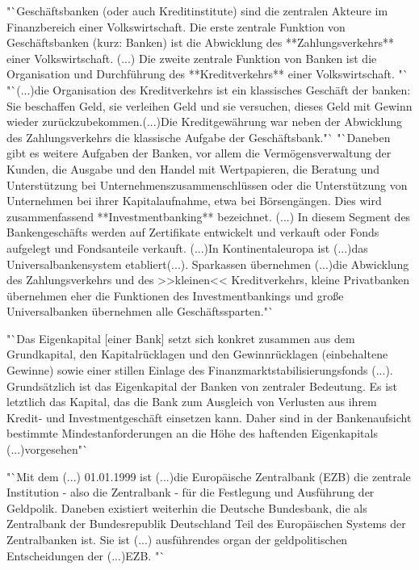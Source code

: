 \citep*[vgl.][S.512-13]{Basseler2010} "`Geschäftsbanken (oder auch Kreditinstitute) sind die zentralen Akteure im Finanzbereich einer Volkswirtschaft. Die erste zentrale Funktion von Geschäftsbanken (kurz: Banken) ist die Abwicklung des **Zahlungsverkehrs** einer Volkswirtschaft. (...) Die zweite zentrale Funktion von Banken ist die Organisation und Durchführung des **Kreditverkehrs** einer Volkswirtschaft. "`
"`(...)die Organisation des Kreditverkehrs ist ein klassisches Geschäft der banken: Sie beschaffen Geld, sie verleihen Geld und sie versuchen, dieses Geld mit Gewinn wieder zurückzubekommen.(...)Die Kreditgewährung war neben der Abwicklung des Zahlungsverkehrs die klassische Aufgabe der Geschäftsbank."`
 "`Daneben gibt es weitere Aufgaben der Banken, vor allem die Vermögensverwaltung der Kunden, die Ausgabe und den Handel mit Wertpapieren, die Beratung und Unterstützung bei Unternehmenszusammenschlüssen oder die Unterstützung von Unternehmen bei ihrer Kapitalaufnahme, etwa bei Börsengängen. Dies wird zusammenfassend **Investmentbanking** bezeichnet. (...) In diesem Segment des Bankengeschäfts  werden auf Zertifikate entwickelt und verkauft oder Fonds aufgelegt und Fondsanteile verkauft. (...)In Kontinentaleuropa ist (...)das Universalbankensystem etabliert(...). Sparkassen übernehmen (...)die Abwicklung des Zahlungsverkehrs und des >>kleinen<< Kreditverkehrs, kleine Privatbanken übernehmen eher die Funktionen des Investmentbankings und große Universalbanken übernehmen alle Geschäftssparten."`

\citep*[vgl.][S.515]{Basseler2010} "`Das Eigenkapital [einer Bank] setzt sich konkret zusammen aus dem Grundkapital, den Kapitalrücklagen und den Gewinnrücklagen (einbehaltene Gewinne) sowie einer stillen Einlage des Finanzmarktstabilisierungsfonds (...). Grundsätzlich ist das Eigenkapital der Banken von zentraler Bedeutung. Es ist letztlich das Kapital, das die Bank zum Ausgleich von Verlusten aus ihrem Kredit- und Investmentgeschäft einsetzen kann.  Daher sind in der Bankenaufsicht bestimmte Mindestanforderungen an die Höhe des haftenden Eigenkapitals (...)vorgesehen"`

\citep*[vgl.][S.512]{Basseler2010}  "`Mit dem (...) 01.01.1999 ist (...)die Europäische Zentralbank (EZB) die zentrale Institution - also die Zentralbank - für die Festlegung und Ausführung der Geldpolik. Daneben existiert weiterhin die Deutsche Bundesbank, die als Zentralbank der Bundesrepublik Deutschland Teil des Europäischen Systems der Zentralbanken ist. Sie ist (...) ausführendes organ der geldpolitischen Entscheidungen der (...)EZB. "`
\clearpage
